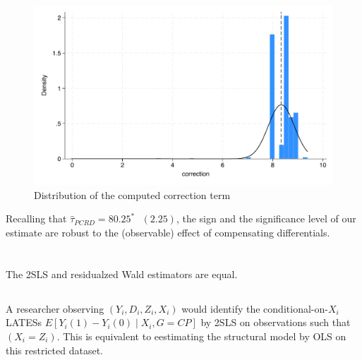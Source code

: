 \documentclass{article}
\begin{document}
\begin{figure}[H]
    \centering
    \includegraphics[scale=0.5]{../outputs/correction_term_distribution_plot.pdf}
    \caption{Distribution of the computed correction term}
    \label{fig:correction}
\end{figure}

Recalling that \(\hat{\tau}_{PCRD} = 80.25^{*}\text{ }(2.25)\), the sign and the significance level of our estimate are robust to the (observable) effect of compensating differentials.

\section{}

\subsection{}



The 2SLS and residualzed Wald estimators are equal.

\subsection{}

A researcher observing \((Y_i,D_i,Z_i,X_i)\) would identify the conditional-on-\(X_i\) LATESs \(E[Y_i(1)-Y_i(0) \mid X_i, G = CP]\) by 2SLS on observations such that \((X_i = Z_i)\). This is equivalent to eestimating the structural model by OLS on this restricted dataset.



\subsection{}
\end{document}
